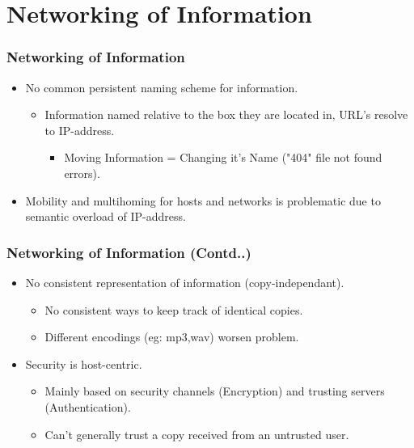 \documentclass [12pt] {beamer}
\begin{document}
\section{Networking of Information}
\begin{frame}
\frametitle{Networking of Information}

  \begin{itemize} [<+->]
 
  \item No common persistent naming scheme for information.
    \begin{itemize} 
      \item Information named relative to the box they are located in, URL's resolve to IP-address.
	\begin{itemize}
	  \item Moving Information = Changing it's Name ("404" file not found errors).
	 \end{itemize}
    \end{itemize}

 \item Mobility and multihoming for hosts and networks is problematic due to semantic overload of IP-address.

  \end{itemize}
\end{frame}

\begin{frame}
\frametitle{Networking of Information (Contd..)}
  \begin{itemize} [<+->]
    \item No consistent representation of information (copy-independant).
      \begin{itemize} 
	\item No consistent ways to keep track of identical copies.
	\item Different encodings (eg: mp3,wav) worsen problem.
      \end{itemize}

    \item Security is host-centric.
      \begin{itemize}
	\item Mainly based on security channels (Encryption) and trusting servers (Authentication).
	\item Can't generally trust a copy received from an untrusted user.
      \end{itemize}

  \end{itemize}
\end{frame}
\end{document}
